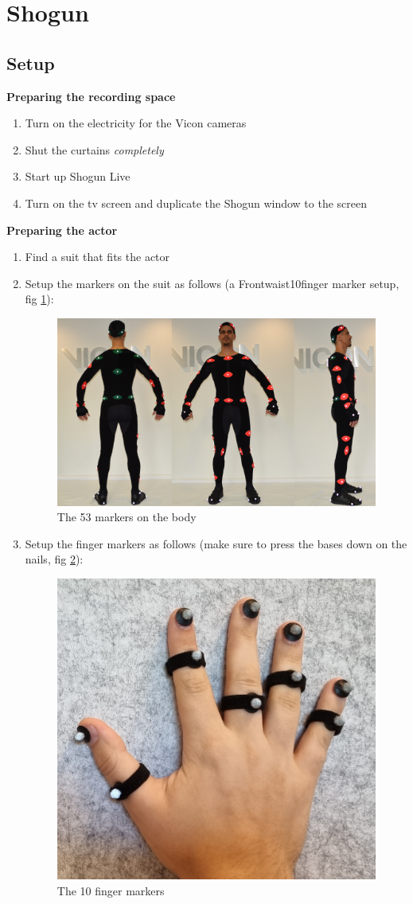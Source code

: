 
\section{Shogun}
\subsection{Setup}
\textbf{Preparing the recording space}
\begin{enumerate}
    \item Turn on the electricity for the Vicon cameras
    \item Shut the curtains \textit{completely}
    \item Start up Shogun Live
    \item Turn on the tv screen and duplicate the Shogun window to the screen
\end{enumerate}
\textbf{Preparing the actor}
\begin{enumerate}
    \item Find a suit that fits the actor
    \item Setup the markers on the suit as follows (a Frontwaist10finger marker setup, fig \ref{suit}):
    \begin{figure}[b!]
        \centering
        \includegraphics[width=1\linewidth]{imgs/suit/MarkerPlacemtAll.png}
        \caption{The 53 markers on the body}
        \label{suit}
    \end{figure}
    \item Setup the finger markers as follows (make sure to press the bases down on the nails, fig \ref{hands}):
    \begin{figure}[t!]
        \centering
        \includegraphics[width=0.5\linewidth]{imgs/suit/fingerSetup.jpg}
        \caption{The 10 finger markers}
        \label{hands}
    \end{figure}
\end{enumerate}
